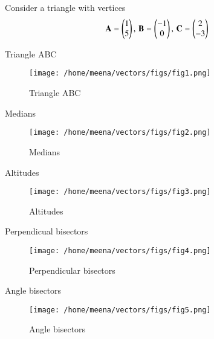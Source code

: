 \documentclass[journal,12pt,onecolumn]{IEEEtran}       \def\inputGnumericTable{}                                 %
\begin{document}
Consider a triangle with vertices
		\begin{align}
			\label{eq:tri-pts}
			\vec{A} = \myvec{1\\ 5},\,
			\vec{B} = \myvec{-1\\ 0},\,
			\vec{C} = \myvec{2\\ -3}
		\end{align}
\begin{table}[!ht]
	
	\caption{Triangle ABC}
	\label{table1}	
\end{table}
\begin{figure}[H]
\texttt{[image: /home/meena/vectors/figs/fig1.png]}
\caption{Triangle ABC}
\label{fig:i_triangle_py}
\end{figure}

\begin{table}[!ht]
	
	\caption{Medians}
	\label{table1}	
\end{table}
\begin{figure}[H]
\texttt{[image: /home/meena/vectors/figs/fig2.png]}
\caption{Medians}
\label{fig:i_triangle_py}
\end{figure}

\begin{table}[!ht]
	
	\caption{Altitudes}
	\label{table1}	
\end{table}
\begin{figure}[H]
\texttt{[image: /home/meena/vectors/figs/fig3.png]}
\caption{Altitudes}
\label{fig:i_triangle_py}
\end{figure}

\begin{table}[!ht]
	
	\caption{Perpendicual bisectors}
	\label{table1}	
\end{table}
\begin{figure}[H]
\texttt{[image: /home/meena/vectors/figs/fig4.png]}
\caption{Perpendicular bisectors}
\label{fig:i_triangle_py}
\end{figure}

\begin{table}[!ht]
	
	\caption{Angle bisectors}
	\label{table1}	
\end{table}
\begin{figure}[H]
\texttt{[image: /home/meena/vectors/figs/fig5.png]}
\caption{Angle bisectors}
\label{fig:i_triangle_py}
\end{figure}
\end{document}
